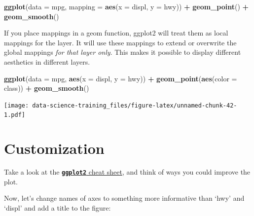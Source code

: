\documentclass[]{book}
\newenvironment{Shaded}{\begin{snugshade}}{\end{snugshade}}
\newcommand{\KeywordTok}[1]{\textcolor[rgb]{0.13,0.29,0.53}{\textbf{#1}}}
\newcommand{\DataTypeTok}[1]{\textcolor[rgb]{0.13,0.29,0.53}{#1}}
\newcommand{\StringTok}[1]{\textcolor[rgb]{0.31,0.60,0.02}{#1}}
\newcommand{\OperatorTok}[1]{\textcolor[rgb]{0.81,0.36,0.00}{\textbf{#1}}}
\newcommand{\NormalTok}[1]{#1}
\theoremstyle{definition}
\theoremstyle{definition}
\theoremstyle{definition}
\theoremstyle{remark}
\begin{document}
\begin{Shaded}
\begin{Highlighting}[]
\KeywordTok{ggplot}\NormalTok{(}\DataTypeTok{data =}\NormalTok{ mpg, }\DataTypeTok{mapping =} \KeywordTok{aes}\NormalTok{(}\DataTypeTok{x =}\NormalTok{ displ, }\DataTypeTok{y =}\NormalTok{ hwy)) }\OperatorTok{+}\StringTok{ }
\StringTok{  }\KeywordTok{geom_point}\NormalTok{() }\OperatorTok{+}\StringTok{ }
\StringTok{  }\KeywordTok{geom_smooth}\NormalTok{()}
\end{Highlighting}
\end{Shaded}

If you place mappings in a geom function, ggplot2 will treat them as
local mappings for the layer. It will use these mappings to extend or
overwrite the global mappings \emph{for that layer only}. This makes it
possible to display different aesthetics in different layers.

\begin{Shaded}
\begin{Highlighting}[]
\KeywordTok{ggplot}\NormalTok{(}\DataTypeTok{data =}\NormalTok{ mpg, }\KeywordTok{aes}\NormalTok{(}\DataTypeTok{x =}\NormalTok{ displ, }\DataTypeTok{y =}\NormalTok{ hwy)) }\OperatorTok{+}\StringTok{ }
\StringTok{  }\KeywordTok{geom_point}\NormalTok{(}\KeywordTok{aes}\NormalTok{(}\DataTypeTok{color =}\NormalTok{ class)) }\OperatorTok{+}\StringTok{ }
\StringTok{  }\KeywordTok{geom_smooth}\NormalTok{()}
\end{Highlighting}
\end{Shaded}

\texttt{[image: data-science-training\_files/figure-latex/unnamed-chunk-42-1.pdf]}

\section{Customization}\label{customization}

Take a look at the
\href{https://www.rstudio.com/wp-content/uploads/2016/11/ggplot2-cheatsheet-2.1.pdf}{\textbf{\texttt{ggplot2}}
cheat sheet}, and think of ways you could improve the plot.

Now, let's change names of axes to something more informative than `hwy'
and `displ' and add a title to the figure:
\end{document}
